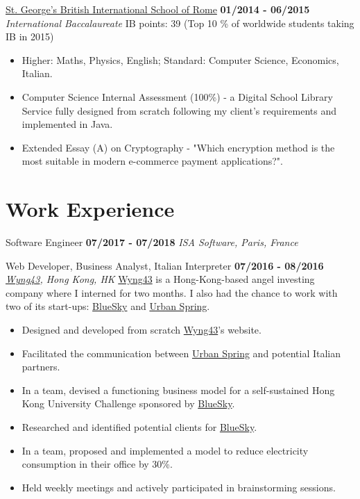\documentclass[]{friggeri-cv}
\begin{document}
\begin{entrylist}
  \entry
    {}
    {\href{http://www.stgeorge.school.it/}{St. George's British International School of Rome}}
    {\textbf{01/2014 - 06/2015}}
    {\emph{International Baccalaureate}}
    {IB points: 39  (Top 10 \% of worldwide students taking IB in 2015)}
    \begin{itemize}
        \item Higher: Maths, Physics, English; Standard: Computer Science, Economics, Italian.
        \item Computer Science Internal Assessment (100\%) - a Digital School Library Service fully designed from scratch following my client's requirements and implemented in Java.
        \item Extended Essay (A) on Cryptography - "Which encryption method is the most suitable in modern e-commerce payment applications?".
    \end{itemize}
\end{entrylist}

\section{\color{red}Work \color{gray} Experience}
\begin{entrylist}
  \entry
    {}
    {Software Engineer}
    {\textbf{07/2017 - 07/2018}}
    {\emph{ISA Software, Paris, France}}
    
\end{entrylist}
\begin{entrylist}
  \entry
    {}
    {Web Developer, Business Analyst, Italian Interpreter}
    {\textbf{07/2016 - 08/2016}}
    {\emph{\href{http://www.wyng43.com/}{Wyng43}, Hong Kong, HK}}
    {\href{http://www.wyng43.com/}{Wyng43} is a Hong-Kong-based angel investing company where I interned for two months. I also had the chance to work with two of its start-ups: \href{http://www.hibluesky.co/}{BlueSky} and \href{http://www.urbanspring.hk/}{Urban Spring}.}
    \begin{itemize}
        \item Designed and developed from scratch \href{http://www.wyng43.com/}{Wyng43}'s website.
        \item Facilitated the communication between \href{http://www.urbanspring.hk/}{Urban Spring} and potential Italian partners.
        \item In a team, devised a functioning business model for a self-sustained Hong Kong University Challenge sponsored by \href{http://www.hibluesky.co/}{BlueSky}.
        \item Researched and identified potential clients for \href{http://www.hibluesky.co/}{BlueSky}. 
        \item In a team, proposed and implemented a model to reduce electricity consumption in their office by 30\%.
        \item Held weekly meetings and actively participated in brainstorming sessions.
    \end{itemize}
\end{entrylist}
\clearpage
\newpage
\end{document}
